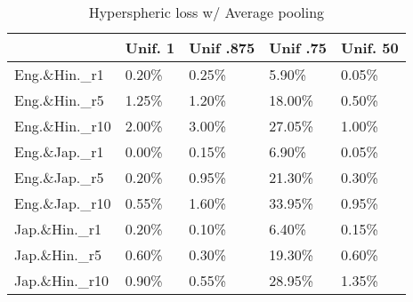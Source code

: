 
\begin{table}
    \centering
    \begin{tabular}{l|l|l|l|l}
        \toprule
        {} & Unif. 1 & Unif .875 & Unif .75 & Unif. 50 \\
        \midrule
        Eng.\&Hin.\_r1  &            0.20\% &                 0.25\% &                5.90\% &                0.05\% \\
        Eng.\&Hin.\_r5  &            1.25\% &                 1.20\% &               18.00\% &                0.50\% \\
        Eng.\&Hin.\_r10 &            2.00\% &                 3.00\% &               27.05\% &                1.00\% \\
        \midrule
        Eng.\&Jap.\_r1  &            0.00\% &                 0.15\% &                6.90\% &                0.05\% \\
        Eng.\&Jap.\_r5  &            0.20\% &                 0.95\% &               21.30\% &                0.30\% \\
        Eng.\&Jap.\_r10 &            0.55\% &                 1.60\% &               33.95\% &                0.95\% \\
        \midrule
        Jap.\&Hin.\_r1  &            0.20\% &                 0.10\% &                6.40\% &                0.15\% \\
        Jap.\&Hin.\_r5  &            0.60\% &                 0.30\% &               19.30\% &                0.60\% \\
        Jap.\&Hin.\_r10 &            0.90\% &                 0.55\% &               28.95\% &                1.35\% \\
        \bottomrule
\end{tabular}


\caption{Hyperspheric loss  w/ Average pooling}
\label{table:hyper_cling}
\end{table}
